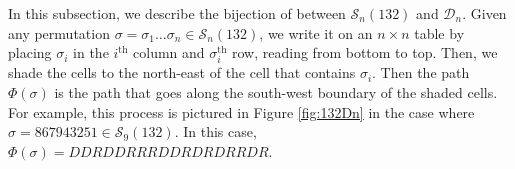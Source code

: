 \documentclass[
final,nomarks
]{dmtcs-episciences}
\newcommand{\fref}[1]{Figure \ref{fig:#1}}
\newcommand{\Sn}[1]{\mathcal{S}_{#1}}
\begin{document}
In this subsection, we describe 
the bijection of \cite{Kr} between \begin{math}\Sn{n}(132)\end{math} and \begin{math}\mathcal{D}_n\end{math}.
Given any permutation \begin{math}\sigma = \sigma_1 \ldots \sigma_n \in\Sn{n}(132)\end{math}, we write it on an \begin{math}n\times n\end{math} table 
by placing \begin{math}\sigma_i\end{math} in the \begin{math}i^{\mathrm{th}}\end{math} column and \begin{math}\sigma_i^{\mathrm{th}}\end{math} row, reading from bottom to top. Then, we 
shade the cells to the north-east of the cell that contains \begin{math}\sigma_i\end{math}. Then the path \begin{math}\Phi(\sigma)\end{math} 
is the path that goes along the south-west boundary of the shaded cells. For example, this 
process is pictured in \fref{132Dn} in the case where  \begin{math}\sigma=867943251\in\Sn{9}(132)\end{math}. 
In this case, \begin{math}\Phi(\sigma)=  DDRDDRRRDDRDRDRRDR\end{math}.  
\end{document}
